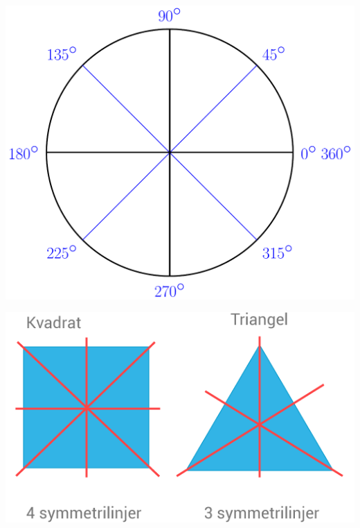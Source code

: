 \documentclass[english,openright ,hidelinks,pdftex, 11 pt,a4, class=article,crop=false]{standalone}
\begin{document}
\thispagestyle{empty}
	
\begin{center}
	\includegraphics[angle=90]{unitcirc}
\end{center}

\newpage
\thispagestyle{empty}
\begin{center}
	\includegraphics[angle=90]{sym}
\end{center}
\end{document}
